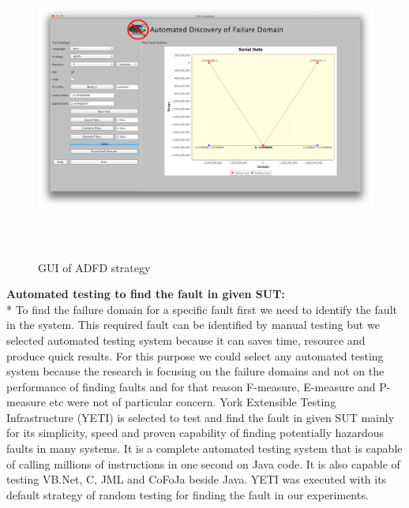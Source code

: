 \documentclass{acm_proc_article-sp}
\begin{document}
\begin{center}
\begin{figure}[htp]
\includegraphics[width=17cm,height=10cm]{adfdFrontEnd.png}
\caption{GUI of ADFD strategy}
\label{fig:patterns}
\end{figure}
\end{center}



\noindent \textbf{Automated testing to find the fault in given SUT:}\\*
\indent To find the failure domain for a specific fault first we need to identify the fault in the system. This required fault can be identified by manual testing but we selected automated testing system because it can saves time, resource and produce quick results. For this purpose we could select any automated testing system because the research is focusing on the failure domains and not on the performance of finding faults and for that reason F-measure, E-measure and P-measure etc were not of particular concern. York Extensible Testing Infrastructure (YETI) is selected to test and find the fault in given SUT mainly for its simplicity, speed and proven capability of finding potentially hazardous faults in many systems. It is a complete automated testing system that is capable of calling millions of instructions in one second on Java code. It is also capable of testing VB.Net, C, JML and CoFoJa beside Java. YETI was executed with its default strategy of random testing for finding the fault in our experiments.\\
\end{document}
